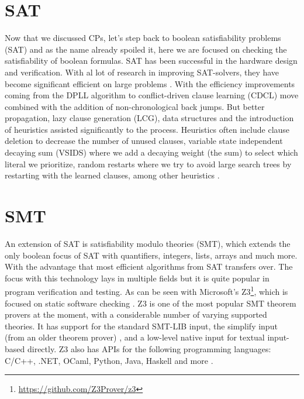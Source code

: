 
\section{SAT}
\label{CS:SAT}
Now that we discussed CPs, let's step back to boolean satisfiability problems (SAT) and as the name already spoiled it, here we are focused on checking the satisfiability of boolean formulas. SAT has been successful in the hardware design and verification. With al lot of research in improving SAT-solvers, they have become significant efficient on large problems \cite{56bardin2019bringing}.
With the efficiency improvements coming from the DPLL algorithm to conflict-driven clause learning (CDCL) move combined with the addition of non-chronological back jumps. But better propagation, lazy clause generation (LCG), data structures and the introduction of heuristics assisted significantly to the process. Heuristics often include clause deletion to decrease the number of unused clauses, variable state independent decaying sum (VSIDS) where we add a decaying weight (the sum) to select which literal we prioritize, random restarts where we try to avoid large search trees by restarting with the learned clauses, among other heuristics \cite{61MCSMarcDenecker, 60katebi2011empirical, 67stuckey2010lazyClauseGeneration}.



\section{SMT}
\label{CS:SMT}
An extension of SAT is satisfiability modulo theories (SMT), which extends the only boolean focus of SAT with quantifiers, integers, lists, arrays and much more. With the advantage that most efficient algorithms from SAT transfers over. The focus with this technology lays in multiple fields but it is quite popular in program verification and testing. As can be seen with Microsoft's Z3\footnote{\url{https://github.com/Z3Prover/z3}}, which is focused on static software checking \cite{54moura2008z3}. Z3 is one of the most popular SMT theorem provers at the moment, with a considerable number of varying supported theories. It has support for the standard SMT-LIB input, the simplify input (from an older theorem prover) \cite{73detlefs2005simplify}, and a low-level native input for textual input-based directly. Z3 also has APIs for the following programming languages: C/C++, .NET, OCaml, Python, Java, Haskell and more \cite{64WikiSMT}.

